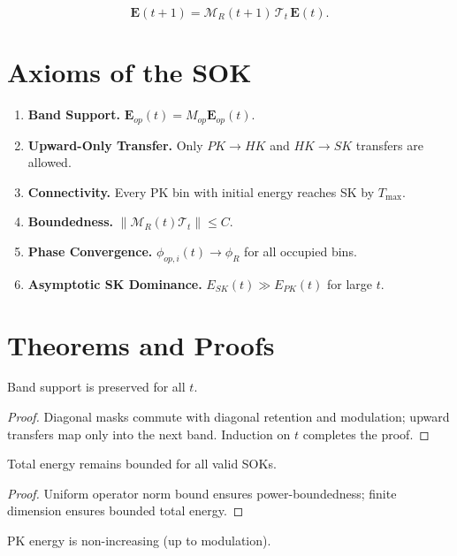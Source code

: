 \documentclass[11pt]{article}
\begin{document}
\[
\mathbf{E}(t+1)=\mathcal{M}_R(t+1)\,\mathcal{T}_t\,\mathbf{E}(t).
\]

\section{Axioms of the SOK}

\begin{enumerate}[label=\textbf{A\arabic*.}]
    \item \textbf{Band Support.} 
    $\mathbf{E}_{op}(t)=M_{op}\mathbf{E}_{op}(t)$.
    \item \textbf{Upward-Only Transfer.} 
    Only $PK\to HK$ and $HK\to SK$ transfers are allowed.
    \item \textbf{Connectivity.} 
    Every PK bin with initial energy reaches SK by $T_{\max}$.
    \item \textbf{Boundedness.} 
    $\|\mathcal{M}_R(t)\mathcal{T}_t\|\le C$.
    \item \textbf{Phase Convergence.} 
    $\phi_{op,i}(t)\to\phi_R$ for all occupied bins.
    \item \textbf{Asymptotic SK Dominance.} 
    $E_{SK}(t)\gg E_{PK}(t)$ for large $t$.
\end{enumerate}

\section{Theorems and Proofs}

\begin{theorem}
Band support is preserved for all $t$.
\end{theorem}

\begin{proof}
Diagonal masks commute with diagonal retention and modulation; upward transfers 
map only into the next band. Induction on $t$ completes the proof.
\end{proof}

\begin{theorem}
Total energy remains bounded for all valid SOKs.
\end{theorem}

\begin{proof}
Uniform operator norm bound ensures power-boundedness; finite dimension ensures 
bounded total energy.
\end{proof}

\begin{theorem}
PK energy is non-increasing (up to modulation).
\end{theorem}
\end{document}
